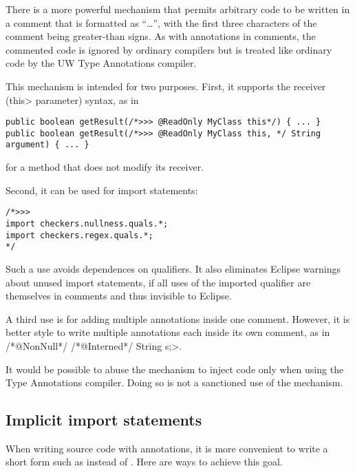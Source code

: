 There is a more powerful mechanism that permits arbitrary code to be
written in a comment that is formatted as ``\code{/*>>>}\ldots\code{*/}'',
with the first three characters of the comment being greater-than signs. As
with annotations in comments, the commented code is ignored by ordinary
compilers but is treated like ordinary code by the UW Type Annotations
compiler.

This mechanism is intended for two purposes.
First, it supports the receiver (\<this> parameter) syntax, as in

\begin{Verbatim}
public boolean getResult(/*>>> @ReadOnly MyClass this*/) { ... }
public boolean getResult(/*>>> @ReadOnly MyClass this, */ String argument) { ... }
\end{Verbatim}

\noindent
for a method that does not modify its receiver.

Second, it can be used for import statements:

\begin{Verbatim}
/*>>>
import checkers.nullness.quals.*;
import checkers.regex.quals.*;
*/
\end{Verbatim}

\noindent
Such a use avoids dependences on qualifiers.  It also eliminates Eclipse
warnings about unused import statements, if all uses of the imported
qualifier are themselves in comments and thus invisible to Eclipse.

A third use is for adding multiple annotations inside one
comment.  However, it is better style to write multiple annotations each
inside its own comment, as in \</*@NonNull*/ /*@Interned*/ String s;>.

It would be possible to abuse the  mechanism to inject
code only when using
the Type Annotations compiler.  Doing so is not a sanctioned use of the
mechanism.


\subsection{Implicit import statements\label{implicit-import-statements}}

When writing source code with annotations, it is more convenient to write a
short form such as  instead of
.  Here are ways to achieve this goal.

\label{jsr308_imports}

